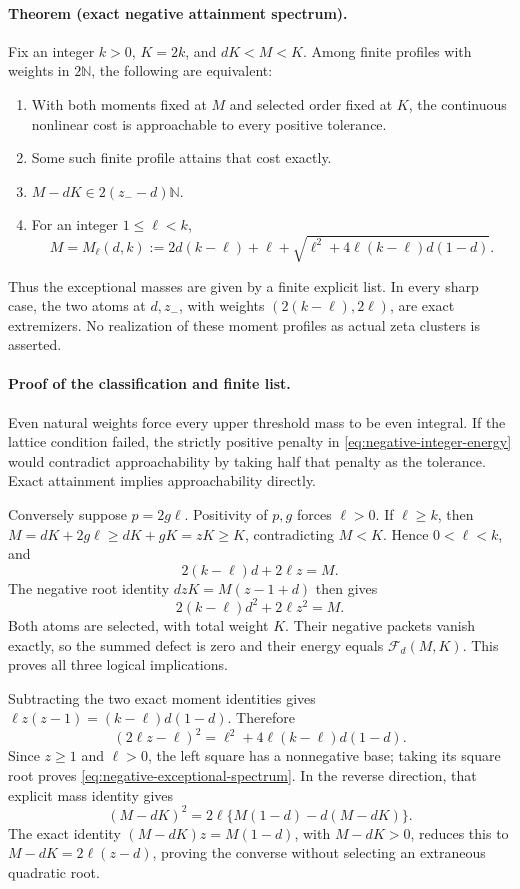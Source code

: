 \paragraph{Theorem (exact negative attainment spectrum).}
Fix an integer \(k>0\), \(K=2k\), and \(dK<M<K\).  Among finite profiles
with weights in \(2\mathbb N\), the following are equivalent:
\begin{enumerate}
\item With both moments fixed at \(M\) and selected order fixed at \(K\),
the continuous nonlinear cost is approachable to every positive tolerance.
\item Some such finite profile attains that cost exactly.
\item \(M-dK\in2(z_--d)\mathbb N\).
\item For an integer \(1\le\ell<k\),
\begin{equation}
 M=M_\ell(d,k):=2d(k-\ell)+\ell+
 \sqrt{\ell^2+4\ell(k-\ell)d(1-d)}.
 \label{eq:negative-exceptional-spectrum}
\end{equation}
\end{enumerate}
Thus the exceptional masses are given by a finite explicit list.  In every
sharp case, the two atoms at \(d,z_-\), with weights
\((2(k-\ell),2\ell)\), are exact extremizers.  No realization of these
moment profiles as actual zeta clusters is asserted.

\paragraph{Proof of the classification and finite list.}
Even natural weights force every upper threshold mass to be even integral.
If the lattice condition failed, the strictly positive penalty in
\eqref{eq:negative-integer-energy} would contradict approachability by
taking half that penalty as the tolerance.  Exact attainment implies
approachability directly.

Conversely suppose \(p=2g\ell\).  Positivity of \(p,g\) forces \(\ell>0\).
If \(\ell\ge k\), then
\(M=dK+2g\ell\ge dK+gK=zK\ge K\), contradicting \(M<K\).
Hence \(0<\ell<k\), and
\[
 2(k-\ell)d+2\ell z=M.
\]
The negative root identity \(dzK=M(z-1+d)\) then gives
\[
 2(k-\ell)d^2+2\ell z^2=M.
\]
Both atoms are selected, with total weight \(K\).  Their negative packets
vanish exactly, so the summed defect is zero and their energy equals
\(\mathcal F_d(M,K)\).  This proves all three logical implications.

Subtracting the two exact moment identities gives
\(\ell z(z-1)=(k-\ell)d(1-d)\).  Therefore
\[
 (2\ell z-\ell)^2=\ell^2+4\ell(k-\ell)d(1-d).
\]
Since \(z\ge1\) and \(\ell>0\), the left square has a nonnegative base;
taking its square root proves \eqref{eq:negative-exceptional-spectrum}.
In the reverse direction, that explicit mass identity gives
\[
 (M-dK)^2=2\ell\{M(1-d)-d(M-dK)\}.
\]
The exact identity \((M-dK)z=M(1-d)\), with \(M-dK>0\), reduces this
to \(M-dK=2\ell(z-d)\), proving the converse without selecting an
extraneous quadratic root.

